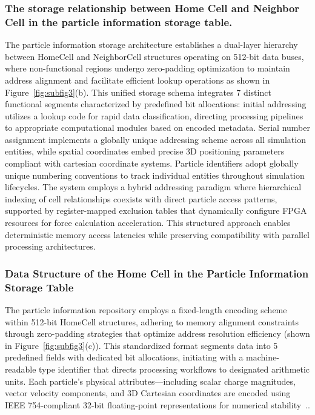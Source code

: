 \documentclass{article}
\begin{document}
\subsubsection{The storage relationship between Home Cell and Neighbor Cell in the particle information storage table.}

\noindent
The particle information storage architecture establishes a dual-layer 
hierarchy between HomeCell and NeighborCell structures operating on 512-bit 
data buses, where non-functional regions undergo zero-padding optimization to 
maintain address alignment and facilitate efficient lookup operations as shown 
in Figure~\ref{fig:subfig3}(b). 
This unified storage schema integrates 7 distinct functional segments 
characterized by predefined bit allocations: initial addressing utilizes a 
lookup code for rapid data classification, directing processing pipelines to 
appropriate computational modules based on encoded metadata. 
Serial number assignment implements a globally unique addressing scheme across 
all simulation entities, while spatial coordinates embed precise 3D positioning 
parameters compliant with cartesian coordinate systems. 
Particle identifiers adopt globally unique numbering conventions to track 
individual entities throughout simulation lifecycles. 
The system employs a hybrid addressing paradigm where hierarchical indexing of 
cell relationships coexists with direct particle access patterns, supported by 
register-mapped exclusion tables that dynamically configure FPGA resources for 
force calculation acceleration. 
This structured approach enables deterministic memory access latencies while 
preserving compatibility with parallel processing architectures.\\

\subsubsection{Data Structure of the Home Cell in the Particle Information Storage Table}
\noindent
The particle information repository employs a fixed-length encoding scheme 
within 512-bit HomeCell structures, adhering to memory alignment constraints 
through zero-padding strategies that optimize address resolution efficiency 
(shown in Figure~\ref{fig:subfig3}(c)). 
This standardized format segments data into 5 predefined fields with dedicated 
bit allocations, initiating with a machine-readable type identifier that 
directs processing workflows to designated arithmetic units. 
Each particle's physical attributes—including scalar charge magnitudes, vector 
velocity components, and 3D Cartesian coordinates are encoded using IEEE 
754-compliant 32-bit floating-point representations for numerical 
stability~.\cite{IEEE_Std_754_2019}.\\
\end{document}
